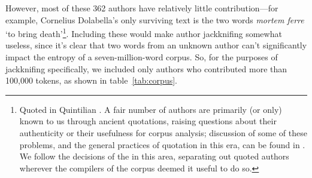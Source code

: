 \documentclass[12pt,twoside]{article}
\begin{document}
However, most of these 362 authors have relatively little contribution---for example, Cornelius Dolabella's only surviving text is the two words \emph{mortem ferre} `to bring death'\footnote{Quoted in Quintilian \citep[VIII.2.4]{quintilian}. A fair number of authors are primarily (or only) known to us through ancient quotations, raising questions about their authenticity or their usefulness for corpus analysis; discussion of some of these problems, and the general practices of quotation in this era, can be found in \citet{vandenhoek}. We follow the decisions of the \citeauthor{phi} in this area, separating out quoted authors wherever the compilers of the corpus deemed it useful to do so.}. Including these would make author jackknifing somewhat useless, since it's clear that two words from an unknown author can't significantly impact the entropy of a seven-million-word corpus. So, for the purposes of jackknifing specifically, we included only authors who contributed more than 100,000 tokens, as shown in table~\ref{tab:corpus}.
\end{document}
